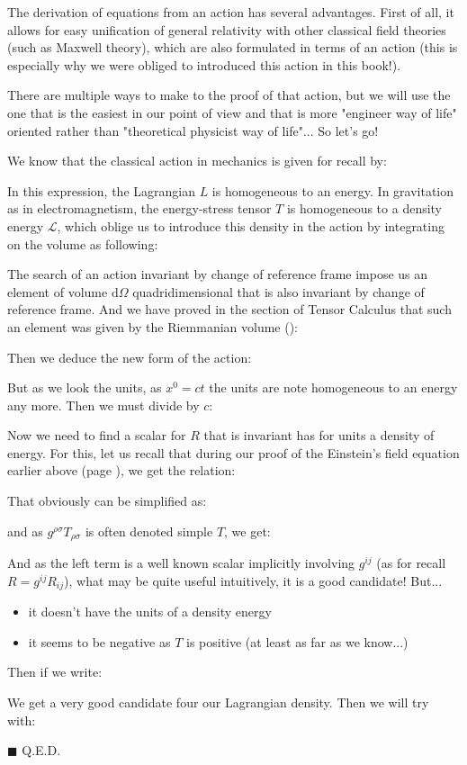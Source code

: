 	The derivation of equations from an action has several advantages. First of all, it allows for easy unification of general relativity with other classical field theories (such as Maxwell theory), which are also formulated in terms of an action (this is especially why we were obliged to introduced this action in this book!).
	
	There are multiple ways to make to the proof of that action, but we will use the one that is the easiest in our point of view and that is more "engineer way of life" oriented rather than "theoretical physicist way of life"... So let's go!
	\begin{dem}
	We know that the classical action in mechanics is given for recall by:
	
	In this expression, the Lagrangian $L$ is homogeneous to an energy. In gravitation as in electromagnetism, the energy-stress tensor $T$ is homogeneous to a density energy $\mathcal{L}$, which oblige us to introduce this density in the action by integrating on the volume as following:
	
	The search of an action invariant by change of reference frame impose us an element of volume $\mathrm{d}\Omega$ quadridimensional that is also invariant by change of reference frame. And we have proved in the section of Tensor Calculus that such an element was given by the Riemmanian volume ():
	
	Then we deduce the new form of the action:
	
	But as we look the units, as $x^0=ct$ the units are note homogeneous to an energy any more. Then we must divide by $c$:
	
	Now we need to find a scalar for $R$ that is invariant has for units a density of energy. For this, let us recall that during our proof of the Einstein's field equation earlier above (page \pageref{einstein field equations}), we get the relation:
	
	That obviously can be simplified as:
	
	and as $g^{\rho\sigma}T_{\rho\sigma}$ is often denoted simple $T$, we get:
	
	And as the left term is a well known scalar implicitly involving $g^{ij}$ (as for recall $R=g^{ij}R_{ij}$), what may be quite useful intuitively, it is a good candidate! But...
	\begin{itemize}
		\item it doesn't have the units of a density energy
		\item it seems to be negative as $T$ is positive (at least as far as we know...)
	\end{itemize}
	Then if we write:
	
	We get a very good candidate four our Lagrangian density. Then we will try with:
	
	\begin{flushright}
		$\blacksquare$  Q.E.D.
	\end{flushright}
	\end{dem}
